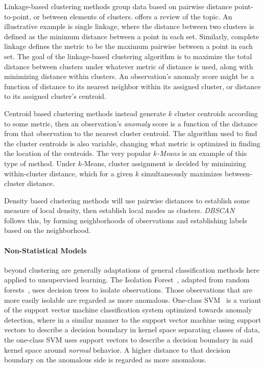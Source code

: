 Linkage-based clustering methods group data based on pairwise distance 
    point-to-point, or between elements of clusters.  \cite{ackerman2010} offers
    a review of the topic.  An illustrative example is single linkage, where 
    the distance between two clusters is defined as the minimum distance 
    between a point in each set.   Similarly, complete linkage defines the 
    metric to be the maximum pairwise between a point in each set.  The goal of 
    the linkage-based clustering algorithm is to maximize the total distance 
    between clusters under whatever metric of distance is used, along with 
    minimizing distance within clusters.  An observation's anomaly score might 
    be a function of distance to its nearest neighbor within its assigned 
    cluster, or distance to its assigned cluster's centroid.

Centroid based clustering methods instead generate $k$ cluster centroids 
    according to some metric, then an observation's \emph{anomaly} score is a 
    function of the distance from that observation to the nearest cluster 
    centroid.  The algorithm used to find the cluster centroids is also 
    variable, changing what metric is optimized in finding the location of the
    centroids.  The very popular \emph{$k$-Means} \citep{hartigan1979} is an 
    example of this type of method.  Under $k$-Means, cluster assignment is 
    decided by minimizing within-cluster distance, which for a given $k$ 
    simultaneously maximizes between-cluster distance.

Density based clustering methods will use pairwise distances to establish some 
    measure of local density, then establish local modes as clusters.
    \emph{DBSCAN}~\citep{ester1996} follows this, by forming neighborhoods of 
    observations and establishing labels based on the neighborhood.

\paragraph{Non-Statistical Models} beyond clustering are generally adaptations 
    of general classification methods here applied to unsupervised learning.  
    The Isolation Forest~\citep{liu2000}, adapted from random 
    forests~\citep{breiman2001}, uses decision trees to isolate observations.
    Those observations that are more easily isolable are regarded as more 
    anomalous.  One-class SVM~\citep{chang2011} is a variant of the support 
    vector machine classification system optimized towards anomaly detection, 
    where in a similar manner to the support vector machine using support 
    vectors to describe a decision boundary in kernel space separating classes 
    of data, the one-class SVM uses support vectors to describe a decision 
    boundary in said kernel space around \emph{normal} behavior. A higher 
    distance to that decision boundary on the anomalous side is regarded as 
    more anomalous.

